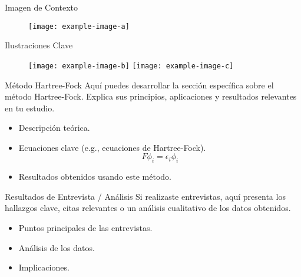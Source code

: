 \documentclass[final]{beamer}
\begin{document}
\begin{frame}[t]
\begin{columns}[T]
    \begin{column}{0.48\textwidth} %

        \begin{block}{Imagen de Contexto}
            \begin{figure}
                \centering
                \texttt{[image: example-image-a]} %
            \end{figure}
        \end{block}

        \begin{block}{Ilustraciones Clave}
            \begin{figure}
                \centering
                \texttt{[image: example-image-b]} %
                \texttt{[image: example-image-c]} %
            \end{figure}
        \end{block}

        \begin{block}{Método Hartree-Fock}
            Aquí puedes desarrollar la sección específica sobre el método Hartree-Fock.
            Explica sus principios, aplicaciones y resultados relevantes en tu estudio.
            \begin{itemize}
                \item Descripción teórica.
                \item Ecuaciones clave (e.g., ecuaciones de Hartree-Fock).
                $$ F \phi_i = \epsilon_i \phi_i $$
                \item Resultados obtenidos usando este método.
            \end{itemize}
        \end{block}

        \begin{block}{Resultados de Entrevista / Análisis}
            Si realizaste entrevistas, aquí presenta los hallazgos clave, citas relevantes
            o un análisis cualitativo de los datos obtenidos.
            \begin{itemize}
                \item Puntos principales de las entrevistas.
                \item Análisis de los datos.
                \item Implicaciones.
            \end{itemize}
        \end{block}


\end{column}
\end{columns}
\end{frame}
\end{document}
